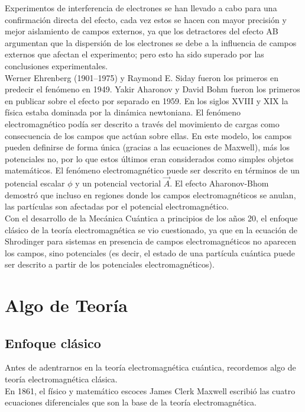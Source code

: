 \documentclass[12pt]{article}
\begin{document}
Experimentos de interferencia de electrones se han llevado a cabo para una confirmación directa del efecto, cada vez estos se hacen con mayor precisión y mejor aislamiento de campos externos, ya que los detractores del efecto AB argumentan que la dispersión de los electrones se debe a la influencia de campos externos que afectan el experimento; pero esto ha sido superado por las conclusiones experimentales.\\
 Werner Ehrenberg (1901–1975) y Raymond E. Siday fueron los primeros en predecir el fenómeno en 1949.  Yakir Aharonov y David Bohm fueron los primeros en publicar sobre el efecto por separado en 1959. En los siglos XVIII y XIX la física estaba dominada por la dinámica newtoniana. El fenómeno electromagnético podía ser descrito a través del movimiento de cargas como consecuencia de los campos que actúan sobre ellas. En este modelo, los campos pueden definirse de forma única (gracias a las ecuaciones de Maxwell), más los potenciales no, por lo que estos últimos eran considerados como simples objetos matemáticos. El fenómeno electromagnético puede ser descrito en términos de un potencial escalar $\phi$ y un potencial vectorial $\vec{A}$. El efecto Aharonov-Bhom demostró que incluso en regiones donde los campos electromagnéticos se anulan, las partículas son afectadas por el potencial electromagnético. \\
 Con el desarrollo de la Mecánica Cuántica a principios de los años 20, el enfoque clásico de la teoría electromagnética se vio cuestionado, ya que en la ecuación de Shrodinger para sistemas en presencia de campos electromagnéticos no aparecen los campos, sino potenciales (es decir, el estado de una partícula cuántica puede ser descrito a partir de los potenciales electromagnéticos). 

\section{Algo de Teoría}

\subsection{Enfoque clásico}

Antes de adentrarnos en la teoría electromagnética cuántica, recordemos algo de teoría electromagnética clásica.\\
En 1861, el físico y matemático escoces James Clerk Maxwell escribió las cuatro ecuaciones diferenciales que son la base de la teoría electromagnética.
\end{document}
